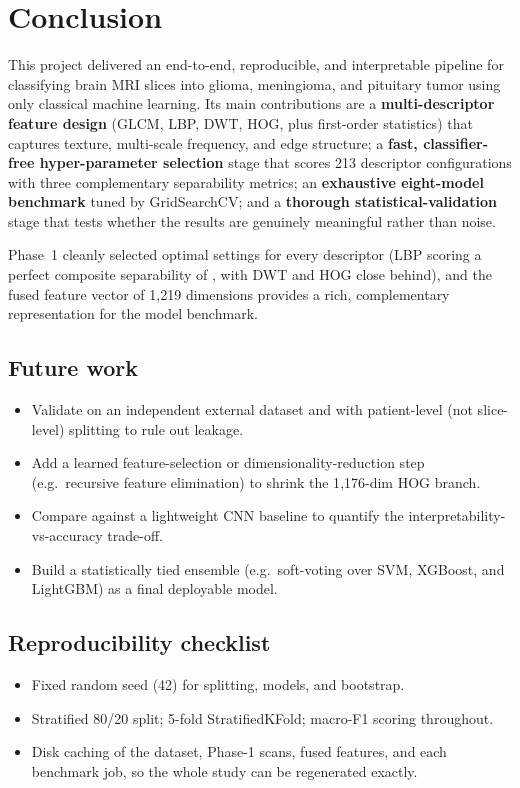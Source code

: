 \section{Conclusion}

This project delivered an end-to-end, reproducible, and interpretable pipeline for classifying brain
MRI slices into glioma, meningioma, and pituitary tumor using only classical machine learning. Its
main contributions are a \textbf{multi-descriptor feature design} (GLCM, LBP, DWT, HOG, plus
first-order statistics) that captures texture, multi-scale frequency, and edge structure; a
\textbf{fast, classifier-free hyper-parameter selection} stage that scores 213 descriptor
configurations with three complementary separability metrics; an \textbf{exhaustive eight-model
benchmark} tuned by GridSearchCV; and a \textbf{thorough statistical-validation} stage that tests
whether the results are genuinely meaningful rather than noise.

Phase~1 cleanly selected optimal settings for every descriptor (LBP scoring a perfect composite
separability of \lbpScore, with DWT and HOG close behind), and the fused feature vector of 1{,}219
dimensions provides a rich, complementary representation for the model benchmark.

\subsection{Future work}
\begin{itemize}[leftmargin=1.4em,itemsep=2pt]
  \item Validate on an independent external dataset and with patient-level (not slice-level)
        splitting to rule out leakage.
  \item Add a learned feature-selection or dimensionality-reduction step (e.g.\ recursive feature
        elimination) to shrink the 1{,}176-dim HOG branch.
  \item Compare against a lightweight CNN baseline to quantify the interpretability-vs-accuracy
        trade-off.
  \item Build a statistically tied ensemble (e.g.\ soft-voting over SVM, XGBoost, and LightGBM) as a
        final deployable model.
\end{itemize}

\subsection{Reproducibility checklist}
\begin{itemize}[leftmargin=1.4em,itemsep=2pt]
  \item Fixed random seed (42) for splitting, models, and bootstrap.
  \item Stratified 80/20 split; 5-fold StratifiedKFold; macro-F1 scoring throughout.
  \item Disk caching of the dataset, Phase-1 scans, fused features, and each benchmark job, so the
        whole study can be regenerated exactly.
\end{itemize}
